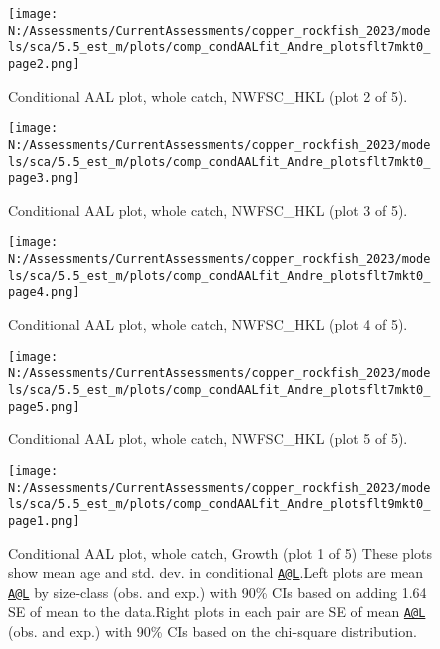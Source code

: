 \documentclass[11pt,
  english,
  letterpaper,
]{article}
\begin{document}
\begin{figure}
\centering
\texttt{[image: N:/Assessments/CurrentAssessments/copper\_rockfish\_2023/models/sca/5.5\_est\_m/plots/comp\_condAALfit\_Andre\_plotsflt7mkt0\_page2.png]}
\caption{Conditional AAL plot, whole catch, NWFSC\_HKL (plot 2 of 5).\label{fig:comp_condAALfit_Andre_plotsflt7mkt0_page2}}
\end{figure}

\begin{figure}
\centering
\texttt{[image: N:/Assessments/CurrentAssessments/copper\_rockfish\_2023/models/sca/5.5\_est\_m/plots/comp\_condAALfit\_Andre\_plotsflt7mkt0\_page3.png]}
\caption{Conditional AAL plot, whole catch, NWFSC\_HKL (plot 3 of 5).\label{fig:comp_condAALfit_Andre_plotsflt7mkt0_page3}}
\end{figure}

\begin{figure}
\centering
\texttt{[image: N:/Assessments/CurrentAssessments/copper\_rockfish\_2023/models/sca/5.5\_est\_m/plots/comp\_condAALfit\_Andre\_plotsflt7mkt0\_page4.png]}
\caption{Conditional AAL plot, whole catch, NWFSC\_HKL (plot 4 of 5).\label{fig:comp_condAALfit_Andre_plotsflt7mkt0_page4}}
\end{figure}

\begin{figure}
\centering
\texttt{[image: N:/Assessments/CurrentAssessments/copper\_rockfish\_2023/models/sca/5.5\_est\_m/plots/comp\_condAALfit\_Andre\_plotsflt7mkt0\_page5.png]}
\caption{Conditional AAL plot, whole catch, NWFSC\_HKL (plot 5 of 5).\label{fig:comp_condAALfit_Andre_plotsflt7mkt0_page5}}
\end{figure}

\begin{figure}
\centering
\texttt{[image: N:/Assessments/CurrentAssessments/copper\_rockfish\_2023/models/sca/5.5\_est\_m/plots/comp\_condAALfit\_Andre\_plotsflt9mkt0\_page1.png]}
\caption{Conditional AAL plot, whole catch, Growth (plot 1 of 5) These plots show mean age and std. dev. in conditional \href{mailto:A@L}{\nolinkurl{A@L}}.Left plots are mean \href{mailto:A@L}{\nolinkurl{A@L}} by size-class (obs. and exp.) with 90\% CIs based on adding 1.64 SE of mean to the data.Right plots in each pair are SE of mean \href{mailto:A@L}{\nolinkurl{A@L}} (obs. and exp.) with 90\% CIs based on the chi-square distribution.\label{fig:comp_condAALfit_Andre_plotsflt9mkt0_page1}}
\end{figure}
\end{document}
